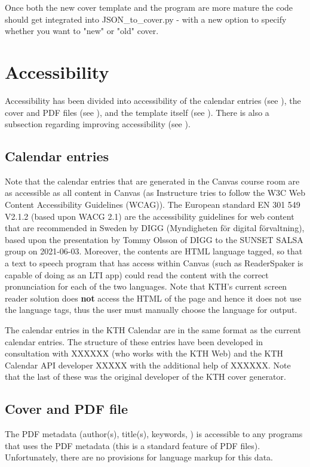 Once both the new cover template and the program are more mature the code should get integrated into JSON\_to\_cover.py - with a new option to specify whether you want to "new" or "old" cover.

\section{Accessibility}
\label{sec:accessibility}
Accessibility has been divided into accessibility of the calendar entries (see ), the cover and PDF files (see ), and the template itself (see ). There is also a subsection regarding improving accessibility (see ).

\subsection{Calendar entries}
\label{sec:accessibilityOfCalendarEntries}
Note that the calendar entries that are generated in the Canvas course room are as accessible as all content in Canvas (as Instructure tries to follow the W3C Web Content Accessibility Guidelines (WCAG)). The European standard EN 301 549 V2.1.2 (based upon WACG 2.1) are the accessibility guidelines for web content that are recommended in Sweden by DIGG (Myndigheten för digital förvaltning), based upon the presentation by Tommy Olsson of DIGG to the SUNSET SALSA group on 2021-06-03. Moreover, the contents are HTML language tagged, so that a text to speech program that has access within Canvas (such as ReaderSpaker is capable of doing as an LTI app) could read the content with the correct pronunciation for each of the two languages. Note that KTH’s current screen reader solution does \textbf{not} access the HTML of the page and hence it does not use the language tags, thus the user must manually choose the language for output.

The calendar entries in the KTH Calendar are in the same format as the current calendar entries. The structure of these entries have been developed in consultation with XXXXXX (who works with the KTH Web) and the KTH Calendar API developer XXXXX with the additional help of XXXXXX. Note that the last of these was the original developer of the KTH cover generator.

\subsection{Cover and PDF file}
\label{sec:ccessibilityOfCoverandPDF}
The PDF metadata (author(s), title(s), keywords, \etc) is accessible to any programs that uses the PDF metadata (this is a standard feature of PDF files). Unfortunately, there are no provisions for language markup for this data.

